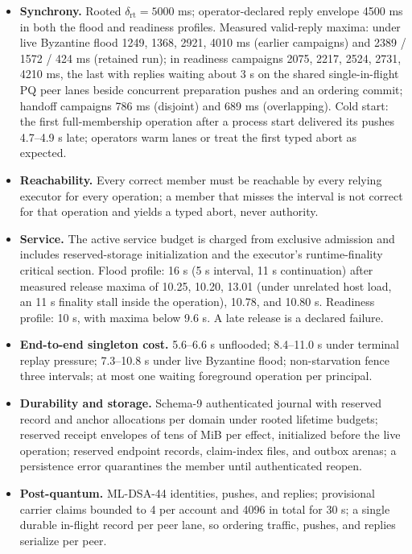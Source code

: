 \documentclass[11pt]{article}
\begin{document}
\begin{itemize}[leftmargin=1.5em]
\item \textbf{Synchrony.} Rooted \(\delta_{\mathrm{rt}} = 5000\) ms;
operator-declared reply envelope 4500 ms in both the flood and readiness
profiles. Measured valid-reply maxima: under live Byzantine flood 1249, 1368,
2921, 4010 ms (earlier campaigns) and 2389 / 1572 / 424 ms (retained run); in
readiness campaigns 2075, 2217, 2524, 2731, 4210 ms, the last with replies
waiting about 3 s on the shared single-in-flight PQ peer lanes beside
concurrent preparation pushes and an ordering commit; handoff campaigns
786 ms (disjoint) and 689 ms (overlapping). Cold start: the first
full-membership operation after a process start delivered its pushes
4.7--4.9 s late; operators warm lanes or treat the first typed abort as
expected.
\item \textbf{Reachability.} Every correct member must be reachable by every
relying executor for every operation; a member that misses the interval is
not correct for that operation and yields a typed abort, never authority.
\item \textbf{Service.} The active service budget is charged from exclusive
admission and includes reserved-storage initialization and the executor's
runtime-finality critical section. Flood profile: 16 s (5 s interval, 11 s
continuation) after measured release maxima of 10.25, 10.20, 13.01 (under
unrelated host load, an 11 s finality stall inside the operation), 10.78,
and 10.80 s. Readiness profile: 10 s, with maxima below 9.6 s. A late
release is a declared failure.
\item \textbf{End-to-end singleton cost.} 5.6--6.6 s unflooded; 8.4--11.0 s
under terminal replay pressure; 7.3--10.8 s under live Byzantine flood;
non-starvation fence three intervals; at most one waiting foreground
operation per principal.
\item \textbf{Durability and storage.} Schema-9 authenticated journal with
reserved record and anchor allocations per domain under rooted lifetime
budgets; reserved receipt envelopes of tens of MiB per effect, initialized
before the live operation; reserved endpoint records, claim-index files, and
outbox arenas; a persistence error quarantines the member until authenticated
reopen.
\item \textbf{Post-quantum.} ML-DSA-44 identities, pushes, and replies;
provisional carrier claims bounded to 4 per account and 4096 in total for
30 s; a single durable in-flight record per peer lane, so ordering traffic,
pushes, and replies serialize per peer.

\end{itemize}
\end{document}
